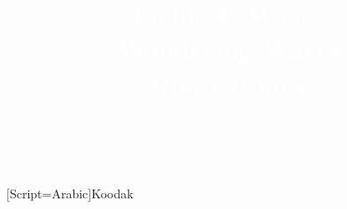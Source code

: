 

\newcommand{\confTitle}{Fields \& Waves} %
\newcommand{\hmwkDueDate}{Wondering Waves} %
\newcommand{\Places}{Bijan Binaee} %
\newcommand{\confCompany}{Summary} %


\title{
\vspace{3.5in}
\textcolor{white}{\textmd{\fontsize{40}{40}\textbf{\confTitle}}\\
\vspace{3.75in}
\small{\hmwkDueDate}\\
\large{\textit{\Places}}
}
}


\author{\textcolor{white}{\textbf{\confCompany}}}
\date{} %


\newfontfamily{\arabicfont}[Script=Arabic]{Koodak}
